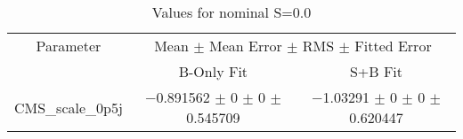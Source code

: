 \begin{table}
\centering
\caption{Values for nominal S=0.0}
\begin{tabular}{ccc}
\toprule
Parameter & \multicolumn{2}{c}{Mean $\pm$ Mean Error $\pm$ RMS $\pm$ Fitted Error}\\
 & B-Only Fit & S+B Fit\\
\midrule
CMS\_scale\_0p5j & \num{-0.891562} $\pm$ \num{0} $\pm$ \num{0} $\pm$ \num{0.545709} & \num{-1.03291} $\pm$ \num{0} $\pm$ \num{0} $\pm$ \num{0.620447}\\
\bottomrule
\end{tabular}
\end{table}